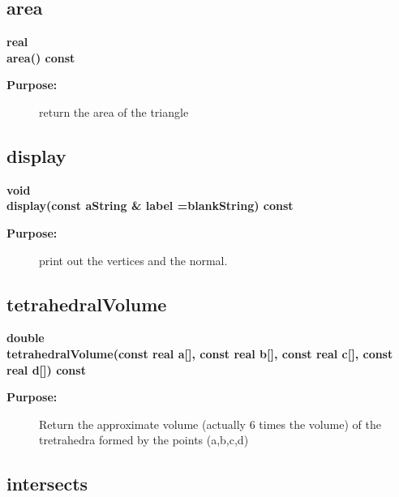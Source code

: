 \subsection{area}
 
\begin{flushleft} \textbf{%
real  \\ 
\settowidth{\TriangleIncludeArgIndent}{area(}%
area() const
}\end{flushleft}
\begin{description}
\item[{\bf Purpose:}]  
    return the area of the triangle
\end{description}
\subsection{display}
 
\begin{flushleft} \textbf{%
void  \\ 
\settowidth{\TriangleIncludeArgIndent}{display(}%
display(const aString \& label  =blankString) const
}\end{flushleft}
\begin{description}
\item[{\bf Purpose:}]  
    print out the vertices and the normal.
\end{description}
\subsection{tetrahedralVolume}
 
\begin{flushleft} \textbf{%
double  \\ 
\settowidth{\TriangleIncludeArgIndent}{tetrahedralVolume(}%
tetrahedralVolume(const real a[], const real b[], const real c[], const real d[]) const
}\end{flushleft}
\begin{description}
\item[{\bf Purpose:}]  
    Return the approximate volume (actually 6 times the volume) of the
      tretrahedra formed by the points (a,b,c,d)
\end{description}
\subsection{intersects}
 
